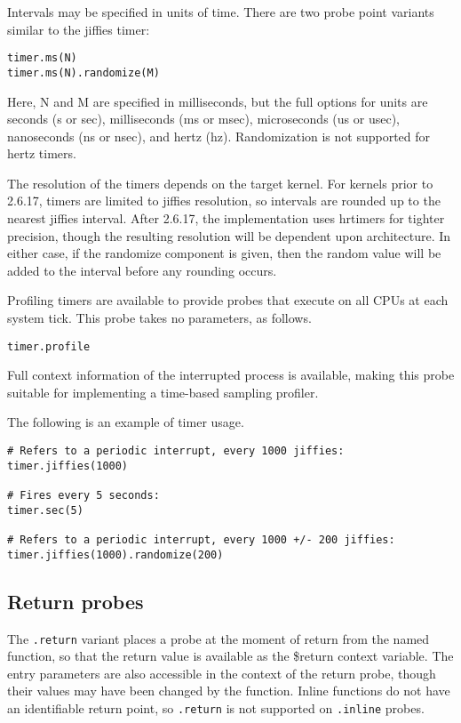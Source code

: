 \documentclass[twoside,english]{article}
\newenvironment{vindent}
{\begin{list}{}{\setlength{\listparindent}{6pt}}
\item[]}
{\end{list}}
\begin{document}
Intervals may be specified in units of time. There are two probe point variants
similar to the jiffies timer:

\begin{vindent}
\begin{verbatim}
timer.ms(N)
timer.ms(N).randomize(M)
\end{verbatim}
\end{vindent}
Here, N and M are specified in milliseconds, but the
full options for units are seconds (s or sec), milliseconds (ms or msec),
microseconds (us or usec), nanoseconds (ns or nsec), and hertz (hz). Randomization
is not supported for hertz timers.

The resolution of the timers depends on the target kernel. For kernels prior
to 2.6.17, timers are limited to jiffies resolution, so intervals are rounded
up to the nearest jiffies interval. After 2.6.17, the implementation uses
hrtimers for tighter precision, though the resulting resolution will be dependent
upon architecture. In either case, if the randomize component is given, then
the random value will be added to the interval before any rounding occurs.

Profiling timers are available to provide probes that execute on all CPUs
at each system tick. This probe takes no parameters, as follows.

\begin{vindent}
\begin{verbatim}
timer.profile
\end{verbatim}
\end{vindent}
Full context information of the interrupted process is available, making
this probe suitable for implementing a time-based sampling profiler.

The following is an example of timer usage.

\begin{vindent}
\begin{verbatim}
# Refers to a periodic interrupt, every 1000 jiffies:
timer.jiffies(1000)

# Fires every 5 seconds:
timer.sec(5)

# Refers to a periodic interrupt, every 1000 +/- 200 jiffies:
timer.jiffies(1000).randomize(200)
\end{verbatim}
\end{vindent}

\subsection{Return probes}
The \texttt{.return} variant places a probe at the moment of return from
the named function, so that the return value is available as the \$return
context variable. The entry parameters are also accessible in the context
of the return probe, though their values may have been changed by the function.
Inline functions do not have an identifiable return point, so \texttt{.return}
is not supported on \texttt{.inline} probes.
\end{document}
